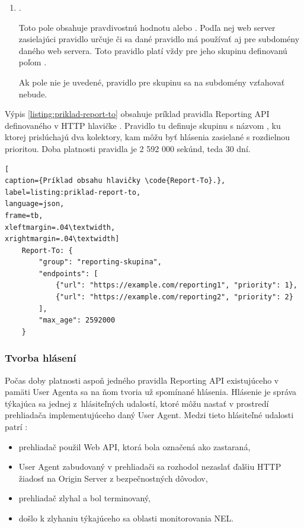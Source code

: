 \begin{enumerate}
    \item {}.

    Toto pole obsahuje pravdivostnú hodnotu  alebo .
    Podľa nej web server zasielajúci pravidlo určuje či sa dané pravidlo má používať aj pre subdomény daného web servera.
    Toto pravidlo platí vždy pre jeho skupinu definovanú poľom .

    Ak pole nie je uvedené, pravidlo pre skupinu  sa na subdomény vzťahovať nebude.
    
\end{enumerate}

Výpis \ref{listing:priklad-report-to} obsahuje príklad pravidla Reporting API definovaného v HTTP hlavičke . 
Pravidlo tu definuje skupinu s názvom , ku ktorej prislúchajú dva kolektory, kam môžu byť hlásenia zasielané s rozdielnou prioritou. 
Doba platnosti pravidla je 2 592 000 sekúnd, teda 30 dní.

\begin{center}
\centering
\begin{lstlisting}[
caption={Príklad obsahu hlavičky \code{Report-To}.},
label=listing:priklad-report-to, 
language=json, 
frame=tb,
xleftmargin=.04\textwidth, 
xrightmargin=.04\textwidth]
    Report-To: {
        "group": "reporting-skupina",
        "endpoints": [
            {"url": "https://example.com/reporting1", "priority": 1},
            {"url": "https://example.com/reporting2", "priority": 2}
        ],
        "max_age": 2592000
    }
\end{lstlisting}
\end{center}


\subsubsection{Tvorba hlásení}

Počas doby platnosti aspoň jedného pravidla Reporting API existujúceho v pamäti 
User Agenta sa na ňom tvoria už spomínané hlásenia.
Hlásenie je správa týkajúca sa jednej \mbox{z hlásiteľných} udalostí, ktoré môžu nastať v prostredí prehliadača implementujúceho daný User Agent.
Medzi tieto hlásiteľné udalosti patrí \cite{W3C-reporting-api}: 
\begin{itemize}
    \item prehliadač použil Web API, ktorá bola označená ako zastaraná,
    \item User Agent zabudovaný v prehliadači sa rozhodol nezaslať ďalšiu HTTP žiadosť na Origin Server z bezpečnostných dôvodov,
    \item prehliadač zlyhal a bol terminovaný,
    \item došlo k zlyhaniu týkajúceho sa oblasti monitorovania NEL.
\end{itemize}


